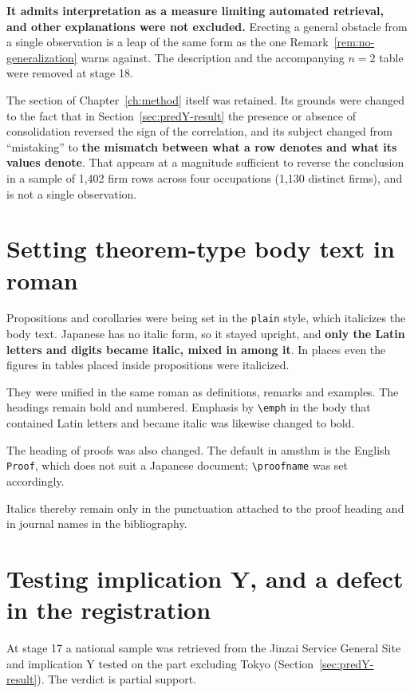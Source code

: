 \textbf{It admits interpretation as a measure limiting automated retrieval, and other explanations
were not excluded.} Erecting a general obstacle from a single observation is a leap of the same
form as the one Remark~\ref{rem:no-generalization} warns against. The description and the
accompanying $n=2$ table were removed at stage 18.

The section of Chapter~\ref{ch:method} itself was retained. Its grounds were changed to the fact
that in Section~\ref{sec:predY-result} the presence or absence of consolidation reversed the sign
of the correlation, and its subject changed from ``mistaking'' to \textbf{the mismatch between what
a row denotes and what its values denote}. That appears at a magnitude sufficient to reverse the
conclusion in a sample of 1,402 firm rows across four occupations (1,130 distinct firms), and is
not a single observation.

\section{Setting theorem-type body text in roman}

Propositions and corollaries were being set in the \texttt{plain} style, which italicizes the body
text. Japanese has no italic form, so it stayed upright, and \textbf{only the Latin letters and
digits became italic, mixed in among it}. In places even the figures in tables placed inside
propositions were italicized.

They were unified in the same roman as definitions, remarks and examples. The headings remain bold
and numbered. Emphasis by \verb|\emph| in the body that contained Latin letters and became italic
was likewise changed to bold.

The heading of proofs was also changed. The default in amsthm is the English \texttt{Proof}, which
does not suit a Japanese document; \verb|\proofname| was set accordingly.

Italics thereby remain only in the punctuation attached to the proof heading and in journal names
in the bibliography.

\section{Testing implication Y, and a defect in the registration}

At stage 17 a national sample was retrieved from the Jinzai Service General Site and implication Y
tested on the part excluding Tokyo (Section~\ref{sec:predY-result}). The verdict is partial
support.

